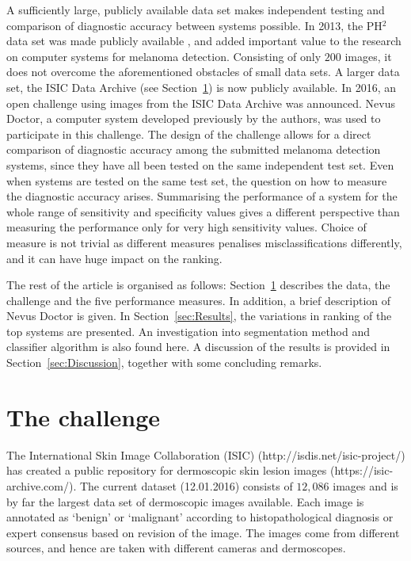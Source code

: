 \documentclass[a4paper,12pt]{article}
\begin{document}
A sufficiently large, publicly available data set makes independent testing and comparison of diagnostic accuracy between systems possible. 
In 2013, the PH$^2$ data set was made publicly available \citep{Mendonca2013PH2}, and added important value to the research on computer systems for melanoma detection. 
Consisting of only $200$ images, it does not overcome the aforementioned obstacles of small data sets. 
A larger data set, the ISIC Data Archive (see Section~\ref{sec:Challenge}) is now publicly available. 
In 2016, an open challenge using images from the ISIC Data Archive was announced. 
Nevus Doctor, a computer system developed previously by the authors, was used to participate in this challenge.
The design of the challenge allows for a direct comparison of diagnostic accuracy among the submitted melanoma detection systems, since they have all been tested on the same independent test set. 
Even when systems are tested on the same test set, the question on how to measure the diagnostic accuracy arises. 
Summarising the performance of a system for the whole range of sensitivity and specificity values gives a different perspective than measuring the performance only for very high sensitivity values. 
Choice of measure is not trivial as different measures penalises misclassifications differently, and it can have huge impact on the ranking. 

The rest of the article is organised as follows: Section~\ref{sec:Challenge} describes the data, the challenge and the five performance measures. In addition, a brief description of Nevus Doctor is given. In Section~\ref{sec:Results}, the variations in ranking of the top systems are presented. An investigation into segmentation method and classifier algorithm is also found here. A discussion of the results is provided in Section~\ref{sec:Discussion}, together with some concluding remarks. 

\section{The challenge} \label{sec:Challenge}

The International Skin Image Collaboration (ISIC) (http://isdis.net/isic-project/) has created a public repository for dermoscopic skin lesion images (https://isic-archive.com/). 
The current dataset (12.01.2016) consists of $12,086$ images and is by far the largest data set of dermoscopic images available. 
Each image is annotated as `benign' or `malignant' according to histopathological diagnosis or expert consensus based on revision of the image. 
The images come from different sources, and hence are taken with different cameras and dermoscopes. 
\end{document}
